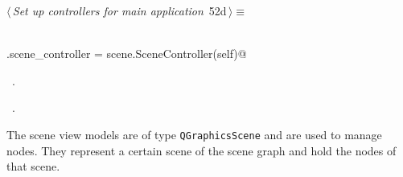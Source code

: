 \documentclass[
    a4paper,      %
    10pt,         %
    openright,    %
    notitlepage,  %
    parskip=half, %
]{scrreprt}       %
\theoremstyle{definition}                    %
\begin{document}
\begin{flushleft} \small
\begin{minipage}{\linewidth}\label{scrap79}\raggedright\small
{} $\langle\,${\itshape Set up controllers for main application}\nobreak\ {\footnotesize {52d}}$\,\rangle\equiv$
\vspace{-1exm}
\begin{list}{}{} \item
\mbox{}\lstinline@@\\
\mbox{}\lstinline@self.scene_controller = scene.SceneController(self)@{\NWsep}
\end{list}
\vspace{-1.5ex}
\footnotesize
\begin{list}{}{\setlength{\itemsep}{-\parsep}\setlength{\itemindent}{-\leftmargin}}
\item \NWtxtMacroDefBy\ .
\item \NWtxtMacroRefIn\ .

\item{}
\end{list}
\end{minipage}\vspace{4ex}
\end{flushleft}
The scene view models are of type \verb+QGraphicsScene+ and are used to manage
nodes. They represent a certain scene of the scene graph and hold the nodes of
that scene.
\end{document}
